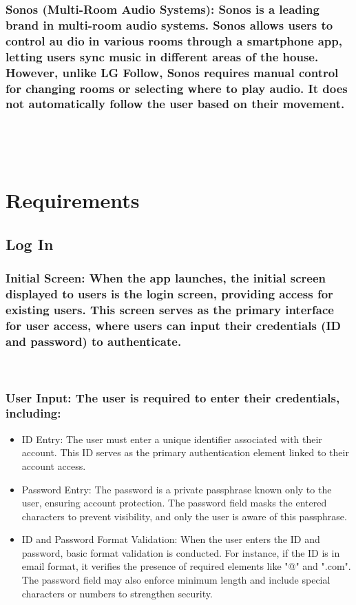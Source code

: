 \documentclass[conference]{IEEEtran}
\begin{document}
\subsubsection{Sonos (Multi-Room Audio Systems): Sonos is a leading brand in multi-room audio systems. Sonos allows users to control au     dio in various rooms through a smartphone app, letting users sync music in different areas of the house. However, unlike LG Follow, Sonos requires manual control for changing rooms or selecting where to play audio. It does not automatically follow the user based on their movement.}
\

\

\section{Requirements}

\subsection{Log In}

\subsubsection{Initial Screen: When the app launches, the initial screen displayed to users is the login screen, providing access for existing users. This screen serves as the primary interface for user access, where users can input their credentials (ID and password) to authenticate.}

\
\subsubsection{User Input: The user is required to enter their credentials, including:}
\begin{itemize}
    \item ID Entry: The user must enter a unique identifier associated with their account. This ID serves as the primary authentication element linked to their account access.\\
    \item Password Entry: The password is a private passphrase known only to the user, ensuring account protection. The password field masks the entered characters to prevent visibility, and only the user is aware of this passphrase.\\
    \item ID and Password Format Validation: When the user enters the ID and password, basic format validation is conducted. For instance, if the ID is in email format, it verifies the presence of required elements like "@" and ".com". The password field may also enforce minimum length and include special characters or numbers to strengthen security.\\
\end{itemize}
\end{document}
